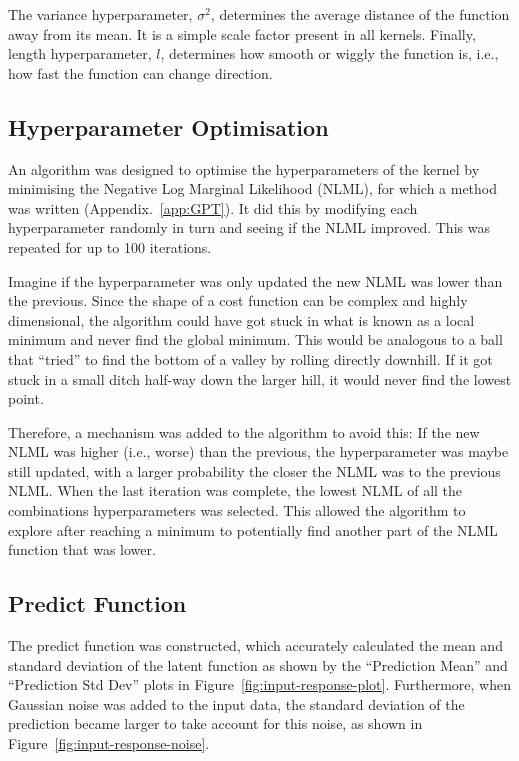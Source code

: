 \documentclass[12pt]{article}
\begin{document}
    The variance hyperparameter, $\sigma^2$, determines the average distance of the function away from its mean.
    It is a simple scale factor present in all kernels.
    Finally, length hyperparameter, $l$, determines how smooth or wiggly the function is, i.e., how fast the function can change direction.

    \subsection{Hyperparameter Optimisation}
    An algorithm was designed to optimise the hyperparameters of the kernel by minimising the Negative Log Marginal Likelihood (NLML), for which a method was written (Appendix.~\ref{app:GPT}).
    It did this by modifying each hyperparameter randomly in turn and seeing if the NLML improved.
    This was repeated for up to 100 iterations.

    Imagine if the hyperparameter was only updated the new NLML was lower than the previous.
    Since the shape of a cost function can be complex and highly dimensional, the algorithm could have got stuck in what is known as a local minimum and never find the global minimum.
    This would be analogous to a ball that ``tried'' to find the bottom of a valley by rolling directly downhill.
    If it got stuck in a small ditch half-way down the larger hill, it would never find the lowest point.

    Therefore, a mechanism was added to the algorithm to avoid this:
    If the new NLML was higher (i.e., worse) than the previous, the hyperparameter was maybe still updated, with a larger probability the closer the NLML was to the previous NLML\@.
    When the last iteration was complete, the lowest NLML of all the combinations hyperparameters was selected.
    This allowed the algorithm to explore after reaching a minimum to potentially find another part of the NLML function that was lower.

    \subsection{Predict Function}
    The predict function was constructed, which accurately calculated the mean and standard deviation of the latent function as shown by the ``Prediction Mean'' and ``Prediction Std Dev'' plots in Figure~\ref{fig:input-response-plot}.
    Furthermore, when Gaussian noise was added to the input data, the standard deviation of the prediction became larger to take account for this noise, as shown in Figure~\ref{fig:input-response-noise}.
\end{document}
